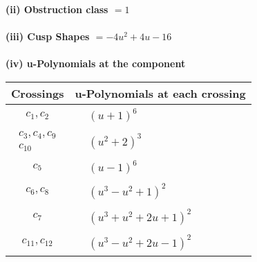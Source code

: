 \documentclass[1p]{elsarticle_modified}
\theoremstyle{definition}
\begin{document}
\flushleft \textbf{(ii) Obstruction class $= 1$}\\~\\
\flushleft \textbf{(iii) Cusp Shapes $= -4 u^2+4 u-16$}\\~\\
\newpage\renewcommand{\arraystretch}{1}
\flushleft \textbf{(iv) u-Polynomials at the component}\newline \\
\begin{tabular}{m{50pt}|m{274pt}}
Crossings & \hspace{64pt}u-Polynomials at each crossing \\
\hline $$\begin{aligned}c_{1},c_{2}\end{aligned}$$&$\begin{aligned}
&(u+1)^6
\end{aligned}$\\
\hline $$\begin{aligned}c_{3},c_{4},c_{9}\\c_{10}\end{aligned}$$&$\begin{aligned}
&(u^2+2)^3
\end{aligned}$\\
\hline $$\begin{aligned}c_{5}\end{aligned}$$&$\begin{aligned}
&(u-1)^6
\end{aligned}$\\
\hline $$\begin{aligned}c_{6},c_{8}\end{aligned}$$&$\begin{aligned}
&(u^3- u^2+1)^2
\end{aligned}$\\
\hline $$\begin{aligned}c_{7}\end{aligned}$$&$\begin{aligned}
&(u^3+u^2+2 u+1)^2
\end{aligned}$\\
\hline $$\begin{aligned}c_{11},c_{12}\end{aligned}$$&$\begin{aligned}
&(u^3- u^2+2 u-1)^2
\end{aligned}$\\
\hline
\end{tabular}\\~\\
\end{document}
